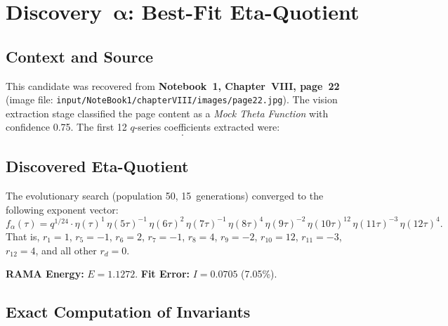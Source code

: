 \section{Discovery~$\boldsymbol{\alpha}$: Best-Fit Eta-Quotient}
\label{sec:candidate_alpha}

\subsection{Context and Source}

This candidate was recovered from \textbf{Notebook~1,
Chapter~VIII, page~22} (image file:
\texttt{input/NoteBook1/chapterVIII/images/page22.jpg}).
The vision extraction stage classified the page content as a
\emph{Mock Theta Function} with confidence 0.75.
The first 12 $q$-series coefficients extracted were:
\begin{equation}
  [1, 1, -1, 1, -2, 2, -3, 3, -4, 5, -6, 7].
\end{equation}

\subsection{Discovered Eta-Quotient}

The evolutionary search (population 50, 15~generations)
converged to the following exponent vector:
\begin{equation}
  \label{eq:alpha_quotient}
  f_\alpha(\tau) = q^{1/24} \cdot
  \eta(\tau)^{1} \,
  \eta(5\tau)^{-1} \,
  \eta(6\tau)^{2} \,
  \eta(7\tau)^{-1} \,
  \eta(8\tau)^{4} \,
  \eta(9\tau)^{-2} \,
  \eta(10\tau)^{12} \,
  \eta(11\tau)^{-3} \,
  \eta(12\tau)^{4}.
\end{equation}
That is, $r_1=1$, $r_5=-1$, $r_6=2$, $r_7=-1$, $r_8=4$,
$r_9=-2$, $r_{10}=12$, $r_{11}=-3$, $r_{12}=4$, and all
other $r_d = 0$.

\textbf{RAMA Energy:} $E = 1.1272$. \quad
\textbf{Fit Error:} $I = 0.0705$ (7.05\%).

\subsection{Exact Computation of Invariants}

